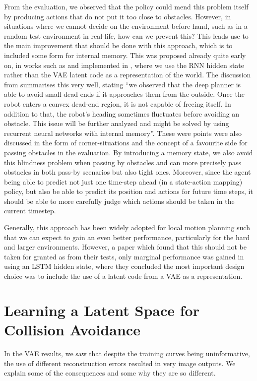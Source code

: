 From the evaluation, we observed that the policy could mend this problem itself by producing actions that do not put it too close to obstacles. However, in situations where we cannot decide on the environment before hand, such as in a random test environment in real-life, how can we prevent this?
This leads use to the main improvement that should be done with this approach, which is to included some form for internal memory. This was proposed already quite early on, in works such as \cite{pfeiffer2017perception} and implemented in \cite{worldModels2018}, where we use the RNN hidden state rather than the VAE latent code as a representation of the world. The discussion from \cite{pfeiffer2017perception} summarises this very well, stating ``we observed that the deep planner is able to avoid small dead ends if it approaches them from the outside. Once the robot enters a convex dead-end region, it is not capable of freeing itself. In addition to that, the robot’s heading sometimes fluctuates before avoiding an obstacle. This issue will be further analyzed and might be solved by using recurrent neural networks with internal memory''.
These were points were also discussed in the form of corner-situations and the concept of a favourite side for passing obstacles in the evaluation. By introducing a memory state, we also avoid this blindness problem when passing by obstacles and can more precisely pass obstacles in both pass-by scenarios but also tight ones. Moreover, since the agent being able to predict not just one time-step ahead (in a state-action mapping) policy, but also be able to predict its position and actions for future time steps, it should be able to more carefully judge which actions should be taken in the current timestep.

Generally, this approach has been widely adopted for local motion planning \cite{deepCollisionPredictorOracle, Badgr, LearningStateRepresentation} such that we can expect to gain an even better performance, particularly for the hard and larger environments. However, a paper which found that this should not be taken for granted as from their tests, only marginal performance was gained in using an LSTM hidden state, where they concluded the most important design choice was to include the use of a latent code from a VAE as a representation.



\section{Learning a Latent Space for Collision Avoidance}
In the VAE results, we saw that despite the training curves being uninformative, the use of different reconstruction errors resulted in very image outputs. We explain some of the consequences and some why they are so different.


